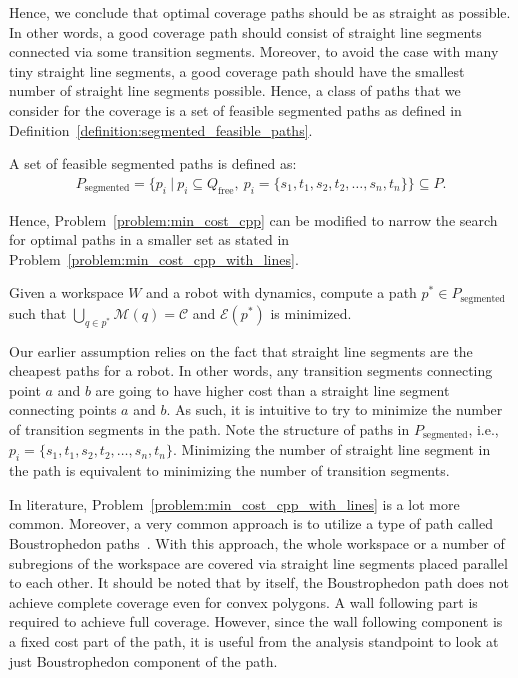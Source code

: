 \documentclass[../main.tex]{subfiles}
\begin{document}
Hence, we conclude that optimal coverage paths should be as straight as possible. In other words, a good coverage path should consist of straight line segments connected via some transition segments. Moreover, to avoid the case with many tiny straight line segments, a good coverage path should have the smallest number of straight line segments possible. Hence, a class of paths that we consider for the coverage is a set of feasible segmented paths as defined in Definition~\ref{definition:segmented_feasible_paths}.

\begin{definition}
\label{definition:segmented_feasible_paths}
A set of feasible segmented paths is defined as:
	\begin{equation}
	\begin{aligned}
		P_{\text{segmented}}=\{p_i\ |\ p_i\subseteq Q_{\text{free}},\  p_i=\{s_1,t_1,s_2,t_2,\dots,s_n,t_n\}\}\subseteq P.
	\end{aligned}
	\end{equation}
\end{definition}

Hence, Problem~\ref{problem:min_cost_cpp} can be modified to narrow the search for optimal paths in a smaller set as stated in Problem~\ref{problem:min_cost_cpp_with_lines}.
\begin{problem}
\label{problem:min_cost_cpp_with_lines}
	Given a workspace $W$ and a robot with dynamics, compute a path $p^*\in P_{\text{segmented}}$ such that $\bigcup_{q\in p^*}\mathcal{M}(q)=\mathcal{C}$ and $\mathcal{E}(p^*)$ is minimized.
\end{problem}

Our earlier assumption relies on the fact that straight line segments are the cheapest paths for a robot. In other words, any transition segments connecting point $a$ and $b$ are going to have higher cost than a straight line segment connecting points $a$ and $b$. As such, it is intuitive to try to minimize the number of transition segments in the path. Note the structure of paths in $P_{\text{segmented}}$, i.e., $p_i=\{s_1,t_1,s_2,t_2,\dots,s_n,t_n\}$. Minimizing the number of straight line segment in the path is equivalent to minimizing the number of transition segments.

In literature, Problem~\ref{problem:min_cost_cpp_with_lines} is a lot more common. Moreover, a very common approach is to utilize a type of path called Boustrophedon paths~\cite{choset2000coverage}. With this approach, the whole workspace or a number of subregions of the workspace are covered via straight line segments placed parallel to each other. It should be noted that by itself, the Boustrophedon path does not achieve complete coverage even for convex polygons. A wall following part is required to achieve full coverage. However, since the wall following component is a fixed cost part of the path, it is useful from the analysis standpoint to look at just Boustrophedon component of the path.
\end{document}
